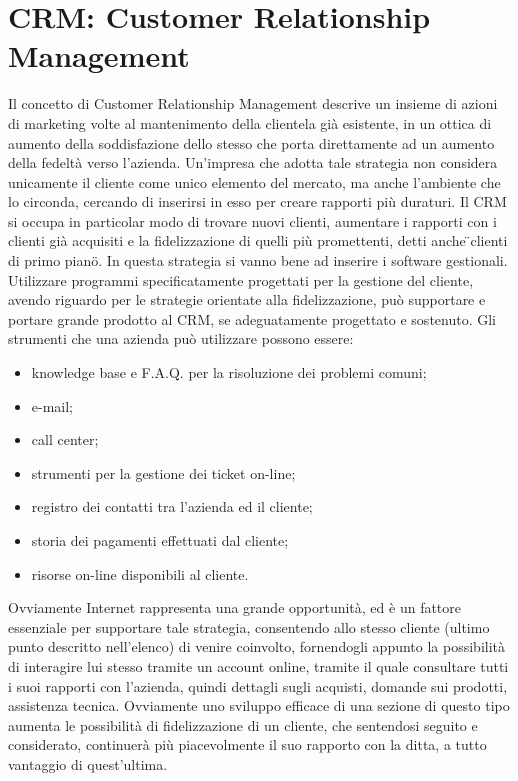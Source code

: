 \section{CRM: Customer Relationship Management}
Il concetto di Customer Relationship Management descrive un insieme di azioni di marketing volte al mantenimento della clientela gi\` a esistente, in un ottica di aumento della soddisfazione dello stesso che porta direttamente ad un aumento della fedelt\` a verso l'azienda. Un'impresa che adotta tale strategia non considera unicamente il cliente come unico elemento del mercato, ma anche l'ambiente che lo circonda, cercando di inserirsi in esso per creare rapporti pi\` u duraturi. Il CRM si occupa in particolar modo di trovare nuovi clienti, aumentare i rapporti con i clienti gi\`a  acquisiti e la fidelizzazione di quelli pi\` u promettenti, detti anche \"{}clienti di primo piano\"{}. 
In questa strategia si vanno bene ad inserire i software gestionali. Utilizzare programmi specificatamente progettati per la gestione del cliente, avendo riguardo per le strategie orientate alla fidelizzazione, pu\` o supportare e portare grande prodotto al CRM, se adeguatamente progettato e sostenuto. Gli strumenti che una azienda pu\` o utilizzare possono essere: 
  \begin{itemize}
    \item  knowledge base e F.A.Q. per la risoluzione dei problemi comuni;
    \item  e-mail;
    \item  call center;
    \item  strumenti per la gestione dei ticket on-line;
    \item  registro dei contatti tra l'azienda ed il cliente;
    \item  storia dei pagamenti effettuati dal cliente;
    \item  risorse on-line disponibili al cliente.
  \end{itemize}
\noindent
Ovviamente Internet rappresenta una grande opportunit\`a, ed \`e un fattore essenziale per supportare tale strategia, consentendo allo stesso cliente (ultimo punto descritto nell'elenco) di venire coinvolto, fornendogli appunto la possibilit\`a di interagire lui stesso tramite un account online, tramite il quale consultare tutti i suoi rapporti con l'azienda, quindi dettagli sugli acquisti, domande sui prodotti, assistenza tecnica. Ovviamente uno sviluppo efficace di una sezione di questo tipo aumenta le possibilit\`a di fidelizzazione di un cliente, che sentendosi seguito e considerato, continuer\`a pi\`u piacevolmente il suo rapporto con la ditta, a tutto vantaggio di quest'ultima. 

